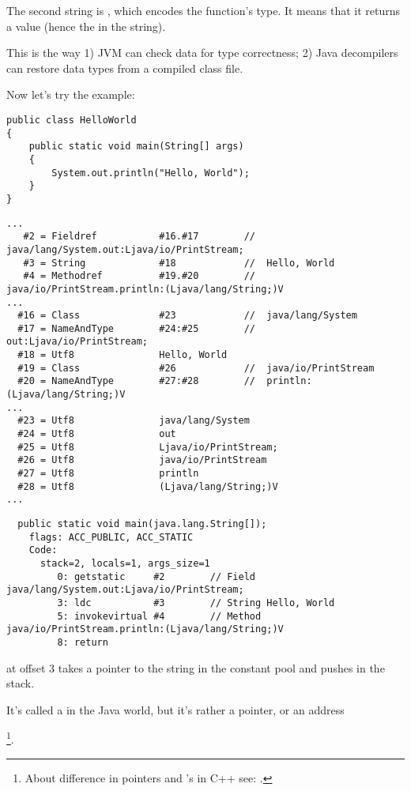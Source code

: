The second string is , which encodes the function's type.
It means that it returns a  value (hence the  in the string).

This is the way 
1) JVM can check data for type correctness; 
2) Java decompilers can restore data types from a compiled class file.


Now let's try the  example:


\begin{lstlisting}[style=customjava]
public class HelloWorld
{
	public static void main(String[] args)
	{
		System.out.println("Hello, World");
	}
}
\end{lstlisting}

\begin{lstlisting}[caption=Constant pool]
...
   #2 = Fieldref           #16.#17        //  java/lang/System.out:Ljava/io/PrintStream;
   #3 = String             #18            //  Hello, World
   #4 = Methodref          #19.#20        //  java/io/PrintStream.println:(Ljava/lang/String;)V
...
  #16 = Class              #23            //  java/lang/System
  #17 = NameAndType        #24:#25        //  out:Ljava/io/PrintStream;
  #18 = Utf8               Hello, World
  #19 = Class              #26            //  java/io/PrintStream
  #20 = NameAndType        #27:#28        //  println:(Ljava/lang/String;)V
...
  #23 = Utf8               java/lang/System
  #24 = Utf8               out
  #25 = Utf8               Ljava/io/PrintStream;
  #26 = Utf8               java/io/PrintStream
  #27 = Utf8               println
  #28 = Utf8               (Ljava/lang/String;)V
...
\end{lstlisting}

\begin{lstlisting}
  public static void main(java.lang.String[]);
    flags: ACC_PUBLIC, ACC_STATIC
    Code:
      stack=2, locals=1, args_size=1
         0: getstatic     #2        // Field java/lang/System.out:Ljava/io/PrintStream;
         3: ldc           #3        // String Hello, World
         5: invokevirtual #4        // Method java/io/PrintStream.println:(Ljava/lang/String;)V
         8: return        
\end{lstlisting}

 at offset 3 takes a pointer to the  string in the constant pool
and pushes in the stack.

It's called a  in the Java world, but it's rather a pointer, or an address

\footnote{About difference in pointers and 's in C++ see: .}.

